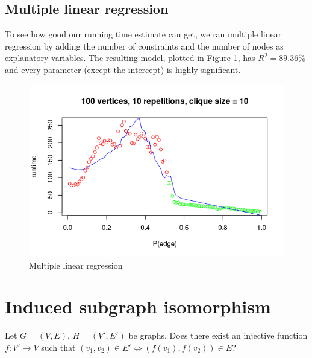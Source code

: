 \documentclass{article}
\theoremstyle{definition}
\begin{document}
\subsection{Multiple linear regression}
To see how good our running time estimate can get, we ran multiple linear regression by adding the number of constraints and the number of nodes as explanatory variables. The resulting model, plotted in Figure \ref{fig:regression2}, has $R^2 = 89.36\%$ and every parameter (except the intercept) is highly significant.
\begin{figure}
  \includegraphics[scale=0.5]{regression2.png}
  \caption{Multiple linear regression}
  \label{fig:regression2}
\end{figure}
\section{Induced subgraph isomorphism}
Let $G = (V, E)$, $H = (V', E')$ be graphs. Does there exist an injective function $f: V' \to V$ such that $(v_1, v_2) \in E' \iff (f(v_1), f(v_2)) \in E$?
\end{document}
